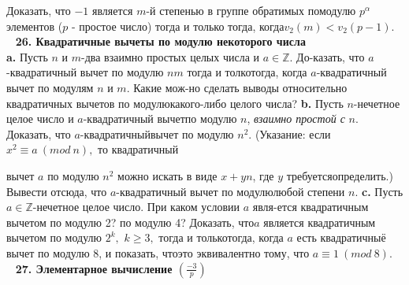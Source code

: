 \documentclass{mai_book}
\begin{document}
    Доказать, что $-1$ является $m$-й степенью в группе обратимых по\newline модулю $p^\alpha$ элементов ($p$ - простое число) тогда и только тогда, когда\newline $v_2(m)<v_2(p-1).$\\
\ \newline
\noindent\textbf{26. Квадратичные вычеты по модулю некоторого числа}\\

	\textbf{a.} Пусть $n$ и $m$-два взаимно простых целых числа и $a\in \mathbb{Z}.$ До-\newline казать, что $a$-квадратичный вычет по модулю $nm$ тогда и толко\newline тогда, когда $a$-квадратичный вычет по модулям $n$ и $m$. Какие мож-\newline но сделать выводы относительно квадратичных вычетов по модулю\newline какого-либо целого числа?\newline
\hspace*{15pt}\textbf{b.} Пусть $n$-нечетное целое число и $a$-квадратичный вычет\newline по модулю $n$, \textit{взаимно простой с} $n$. Доказать, что $a$-квадратичный\newline вычет по модулю $n^2.$ (Указание: если $x^2\equiv a\ (mod\ n),$ то квадратичный \newline

\newpage

	\noindent вычет $a$ по модулю $n^2$ можно искать в виде $x+yn$, где $y$ требуется\newline определить.) Вывести отсюда, что $a$-квадратичный вычет по модулю\newline любой степени $n.$\newline
\hspace*{15pt}\textbf{c.} Пусть $a\in \mathbb{Z}$-нечетное целое число. При каком условии $a$ явля-\newline ется квадратичным вычетом по модулю 2? по модулю 4? Доказать, что\newline $a$ является квадратичным вычетом по модулю $2^k,$ $k\geqslant 3,$ тогда и только\newline тогда, когда $a$ есть квадратичныё вычет по модулю 8, и показать, что\newline это эквивалентно тому, что $a\equiv 1\ (mod\ 8).$\\
\ \newline
\noindent\textbf{27. Элементарное вычисление $(\frac{-3}{p})$}\\
\end{document}
